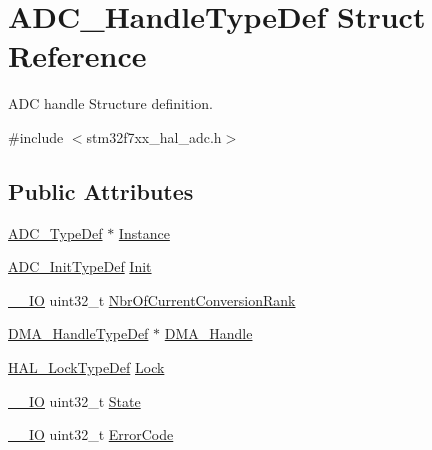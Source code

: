 \hypertarget{struct_a_d_c___handle_type_def}{}\section{A\+D\+C\+\_\+\+Handle\+Type\+Def Struct Reference}
\label{struct_a_d_c___handle_type_def}


A\+DC handle Structure definition.  




{\ttfamily \#include $<$stm32f7xx\+\_\+hal\+\_\+adc.\+h$>$}

\subsection*{Public Attributes}
\begin{DoxyCompactItemize}
\item 
\mbox{\hyperlink{struct_a_d_c___type_def}{A\+D\+C\+\_\+\+Type\+Def}} $\ast$ \mbox{\hyperlink{struct_a_d_c___handle_type_def_a3d89e51782aec71f9cfdff63f943d785}{Instance}}
\item 
\mbox{\hyperlink{struct_a_d_c___init_type_def}{A\+D\+C\+\_\+\+Init\+Type\+Def}} \mbox{\hyperlink{struct_a_d_c___handle_type_def_a43986a9a8ff67bdb398c01db82fda605}{Init}}
\item 
\mbox{\hyperlink{core__sc300_8h_aec43007d9998a0a0e01faede4133d6be}{\+\_\+\+\_\+\+IO}} uint32\+\_\+t \mbox{\hyperlink{struct_a_d_c___handle_type_def_a434bd009117470aa394a3043fa759dc8}{Nbr\+Of\+Current\+Conversion\+Rank}}
\item 
\mbox{\hyperlink{group___d_m_a___exported___types_ga41b754a906b86bce54dc79938970138b}{D\+M\+A\+\_\+\+Handle\+Type\+Def}} $\ast$ \mbox{\hyperlink{struct_a_d_c___handle_type_def_a1983db16acacd5f0b2881e43010dcd72}{D\+M\+A\+\_\+\+Handle}}
\item 
\mbox{\hyperlink{stm32f7xx__hal__def_8h_ab367482e943333a1299294eadaad284b}{H\+A\+L\+\_\+\+Lock\+Type\+Def}} \mbox{\hyperlink{struct_a_d_c___handle_type_def_a7ef248e63b28b67cd985bafaeffd68ba}{Lock}}
\item 
\mbox{\hyperlink{core__sc300_8h_aec43007d9998a0a0e01faede4133d6be}{\+\_\+\+\_\+\+IO}} uint32\+\_\+t \mbox{\hyperlink{struct_a_d_c___handle_type_def_abd63d2ae2064ef230986a43ae48f3df8}{State}}
\item 
\mbox{\hyperlink{core__sc300_8h_aec43007d9998a0a0e01faede4133d6be}{\+\_\+\+\_\+\+IO}} uint32\+\_\+t \mbox{\hyperlink{struct_a_d_c___handle_type_def_a576634bdfdae8c61203a232876d2ba72}{Error\+Code}}
\end{DoxyCompactItemize}


